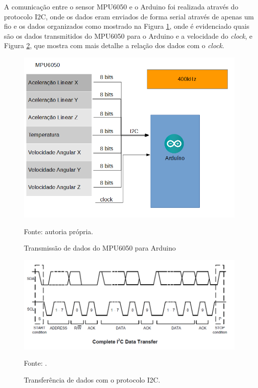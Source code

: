 		A comunicação entre o sensor MPU6050 e o Arduino foi realizada através do protocolo I2C, onde os dados eram enviados de forma serial através de apenas um fio e os dados organizados como mostrado na Figura \ref{comunicacao}, onde é evidenciado quais são os dados transmitidos do MPU6050 para o Arduino e a velocidade do \textit{clock}, e Figura \ref{i2c}, que mostra com mais detalhe a relação dos dados com o \textit{clock}.
		
		\begin{figure}[h]
			\centering
			\includegraphics[keepaspectratio=true,scale=0.4]{figuras/comunicacao.PNG}
			\caption{ Transmissão de dados do MPU6050 para Arduino}
			Fonte: autoria própria. 
			\label{comunicacao}	
		\end{figure}
		
		\begin{figure}[h]
			\centering
			\includegraphics[keepaspectratio=true,scale=0.5]{figuras/i2c.PNG}
			\caption{Transferência de dados com o protocolo I2C. }
			Fonte: \cite{mpu6050}. 
			\label{i2c}	
		\end{figure}
	
